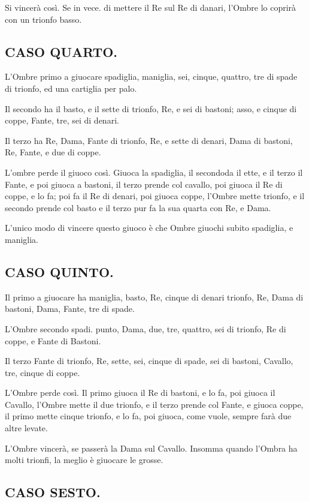 \documentclass[11pt,a6paper]{article}
\begin{document}
Si vincerà così. Se in vece. di mettere il
Re sul Re di danari, l'Ombre lo coprirà con
un trionfo basso.

\subsection{CASO QUARTO.}
L'Ombre primo a giuocare spadiglia, maniglia,
sei, cinque, quattro, tre di spade
di trionfo, ed una cartiglia per palo.

Il secondo ha il basto, e il sette di trionfo,
Re, e sei di bastoni; asso, e cinque di
coppe, Fante, tre, sei di denari.

Il terzo ha Re, Dama, Fante di trionfo,
Re, e sette di denari, Dama di bastoni, Re,
Fante, e due di coppe.

L'ombre perde il giuoco così. Giuoca la
spadiglia, il secondoda il ette, e il terzo il
Fante, e poi giuoca a bastoni, il terzo prende
col cavallo, poi giuoca il Re di coppe, e lo
fa; poi fa il Re di denari, poi giuoca coppe,
l'Ombre mette trionfo, e il secondo prende
col basto e il terzo pur fa la sua quarta con
Re, e Dama.

L'unico modo di vincere questo giuoco è
che Ombre giuochi subito spadiglia, e maniglia.
\subsection{CASO QUINTO.}

Il primo a giuocare ha maniglia, basto,
Re, cinque di denari trionfo, Re, Dama
di bastoni, Dama, Fante, tre di spade.

L'Ombre secondo spadi. punto, Dama,
due, tre, quattro, sei di trionfo, Re di
coppe, e Fante di Bastoni.

Il terzo Fante di trionfo, Re, sette, sei,
cinque di spade, sei di bastoni, Cavallo,
tre, cinque di coppe.

L'Ombre perde così. Il primo giuoca il
Re di bastoni, e lo fa, poi giuoca il Cavallo,
l'Ombre mette il due trionfo, e il terzo
prende col Fante, e giuoca coppe, il primo
mette cinque trionfo, e lo fa, poi giuoca,
come vuole, sempre farà due altre levate.

L'Ombre vincerà, se passerà la Dama sul
Cavallo. Insomma quando l'Ombra ha molti
trionfi, la meglio è giuocare le grosse.

\subsection{CASO SESTO.}
\end{document}
